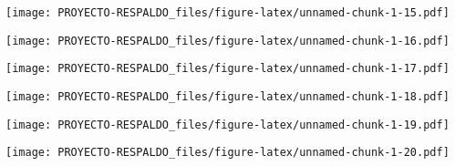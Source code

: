 \documentclass[
]{article}
\newenvironment{Shaded}{\begin{snugshade}}{\end{snugshade}}
\newcommand{\DataTypeTok}[1]{\textcolor[rgb]{0.13,0.29,0.53}{#1}}
\newcommand{\KeywordTok}[1]{\textcolor[rgb]{0.13,0.29,0.53}{\textbf{#1}}}
\newcommand{\NormalTok}[1]{#1}
\newcommand{\OperatorTok}[1]{\textcolor[rgb]{0.81,0.36,0.00}{\textbf{#1}}}
\newcommand{\StringTok}[1]{\textcolor[rgb]{0.31,0.60,0.02}{#1}}
\begin{document}
\texttt{[image: PROYECTO-RESPALDO\_files/figure-latex/unnamed-chunk-1-15.pdf]}

\begin{Shaded}
\end{Shaded}

\texttt{[image: PROYECTO-RESPALDO\_files/figure-latex/unnamed-chunk-1-16.pdf]}

\begin{Shaded}
\end{Shaded}

\texttt{[image: PROYECTO-RESPALDO\_files/figure-latex/unnamed-chunk-1-17.pdf]}

\begin{Shaded}
\end{Shaded}

\texttt{[image: PROYECTO-RESPALDO\_files/figure-latex/unnamed-chunk-1-18.pdf]}

\begin{Shaded}
\end{Shaded}

\texttt{[image: PROYECTO-RESPALDO\_files/figure-latex/unnamed-chunk-1-19.pdf]}

\begin{Shaded}
\end{Shaded}

\texttt{[image: PROYECTO-RESPALDO\_files/figure-latex/unnamed-chunk-1-20.pdf]}

\begin{Shaded}
\end{Shaded}
\end{document}

